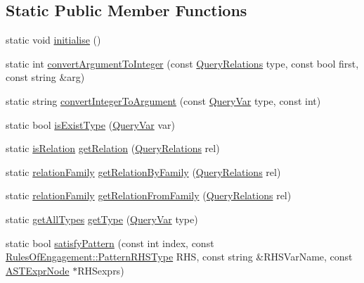 \subsection*{Static Public Member Functions}
\begin{DoxyCompactItemize}
\item 
static void \hyperlink{class_rules_of_engagement_a4ffc088479ffe671fdcc3ff658faa973}{initialise} ()
\item 
static int \hyperlink{class_rules_of_engagement_a82a4e55b543189f43f270cb32b7f9e49}{convert\-Argument\-To\-Integer} (const \hyperlink{class_rules_of_engagement_a5e08db2a0638b98dbb06ad923a33d817}{Query\-Relations} type, const bool first, const string \&arg)
\item 
static string \hyperlink{class_rules_of_engagement_a3d3457698b69480b4aa5173177a5c439}{convert\-Integer\-To\-Argument} (const \hyperlink{class_rules_of_engagement_a5dd2b28fd0c906d9b08e29e371713ead}{Query\-Var} type, const int)
\item 
static bool \hyperlink{class_rules_of_engagement_a7e5a03b2d97eaf0ae5ba44ad6b0a2fe5}{is\-Exist\-Type} (\hyperlink{class_rules_of_engagement_a5dd2b28fd0c906d9b08e29e371713ead}{Query\-Var} var)
\item 
static \hyperlink{class_rules_of_engagement_aad838c0ef69d7c4ee9bef23a431ff6c1}{is\-Relation} \hyperlink{class_rules_of_engagement_a18a80f1ce5bcf4c10fa520a0785c0922}{get\-Relation} (\hyperlink{class_rules_of_engagement_a5e08db2a0638b98dbb06ad923a33d817}{Query\-Relations} rel)
\item 
static \hyperlink{class_rules_of_engagement_a81832aa421c58fe508e3ace862e1288e}{relation\-Family} \hyperlink{class_rules_of_engagement_ade5428f4b20d617254bedff1b5a43648}{get\-Relation\-By\-Family} (\hyperlink{class_rules_of_engagement_a5e08db2a0638b98dbb06ad923a33d817}{Query\-Relations} rel)
\item 
static \hyperlink{class_rules_of_engagement_a81832aa421c58fe508e3ace862e1288e}{relation\-Family} \hyperlink{class_rules_of_engagement_abcaa96fcf051ed0e5b9cb9cfbbab4e55}{get\-Relation\-From\-Family} (\hyperlink{class_rules_of_engagement_a5e08db2a0638b98dbb06ad923a33d817}{Query\-Relations} rel)
\item 
static \hyperlink{class_rules_of_engagement_a1a051f48865a7a4d7f07f0a89f16aafe}{get\-All\-Types} \hyperlink{class_rules_of_engagement_a2b4845903e7378ebf4955714da0d36bf}{get\-Type} (\hyperlink{class_rules_of_engagement_a5dd2b28fd0c906d9b08e29e371713ead}{Query\-Var} type)
\item 
static bool \hyperlink{class_rules_of_engagement_a6d82299f9e291ea53856f9eeff143451}{satisfy\-Pattern} (const int index, const \hyperlink{class_rules_of_engagement_a97613ded2253a252de010070d7c54ac1}{Rules\-Of\-Engagement\-::\-Pattern\-R\-H\-S\-Type} R\-H\-S, const string \&R\-H\-S\-Var\-Name, const \hyperlink{class_a_s_t_expr_node}{A\-S\-T\-Expr\-Node} $\ast$R\-H\-Sexprs)
\end{DoxyCompactItemize}
